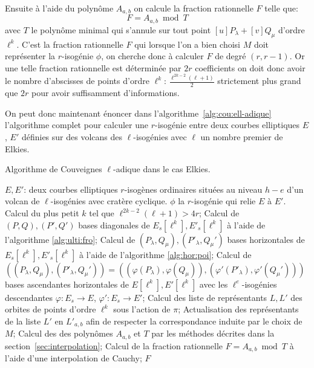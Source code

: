 \documentclass[10pt,a4paper]{book}
\theoremstyle{plain}
\theoremstyle{definition}
\theoremstyle{definition}
\theoremstyle{definition}
\theoremstyle{definition}
\theoremstyle{definition}
\theoremstyle{remark}
\theoremstyle{remark}
\theoremstyle{definition}
\begin{document}
Ensuite à l'aide du polynôme $A_{a,b}$ on calcule la fraction rationnelle $F$ telle que:
\[
F=A_{a,b} \bmod T
\]
avec $T$ le polynôme minimal qui s'annule sur tout point $[u]P_{\lambda}+[v]Q_{\mu}$ d'ordre 
$\ell^k$. C'est la fraction rationnelle $F$ qui lorsque l'on a bien choisi 
$M$ doit représenter la $r$-isogénie $\phi$, on cherche donc à 
calculer $F$ de degré $(r,r-1)$. Or une telle fraction rationnelle est 
déterminée par $2r$ coefficients on doit donc avoir
le nombre d'abscisses de points d'ordre $\ell^k$: $\frac{\ell^{2k-2}(\ell+1)}
{2}$ strictement plus grand que $2r$ pour avoir suffisamment d'informations.


On peut donc maintenant énoncer dans l'algorithme~\ref{alg:cou:ell-adique} 
l'algorithme complet  pour calculer une $r$-isogénie entre deux
courbes elliptiques $E$, $E'$ définies sur des volcans des $\ell$-isogénies avec
$\ell$ un nombre premier de Elkies. 

\begin{algorithm}
\caption{\label{alg:cou:ell-adique} Algorithme de Couveignes $\ell$-adique dans le cas Elkies.}
\begin{algorithmic}[1]
\REQUIRE $E,E'$: deux courbes elliptiques $r$-isogènes ordinaires situées au niveau $h-e$ d'un volcan de $\ell$-isogénies avec cratère cyclique.
\ENSURE $\phi$ la $r$-isogénie qui relie $E$ à $E'$.
\STATE Calcul du plus petit $k$ tel que $\ell^{2k-2}(\ell+1)>4r$;
\STATE  \label{alg:cou-ell:bdiag}
Calcul de $(P,Q),(P',Q')$ bases diagonales de $E_s[\ell^k],E'_s[\ell^k]$ à l'aide de l'algorithme \ref{alg:ulti:fro};
\STATE \label{alg:cou-ell:bhor}
Calcul de $(P_{\lambda},Q_{\mu}),(P'_{\lambda},Q_{\mu}')$ bases horizontales de
$E_s[\ell^k],E'_s[\ell^k]$ à l'aide de l'algorithme \ref{alg:hor:poi};
\STATE Calcul de $((P_{\lambda},Q_{\mu}),(P'_{\lambda},Q_{\mu}'))=
((\varphi(P_{\lambda}),\varphi(Q_{\mu})),(\varphi'(P'_{\lambda}),\varphi'(
Q_{\mu}')))$ bases ascendantes horizontales de $E[\ell^k],E'[\ell^k]$ avec les $\ell^e$-isogénies descendantes $\varphi: E_s \rightarrow E$, $\varphi': E_s \rightarrow E'$;
\ENDIF
\STATE \label{alg:cou-ell:rep} Calcul des liste de représentants $L,L'$ des orbites de points d'ordre $\ell^k$ sous l'action de $\pi$;
\STATE \label{alg:cou-ell:ord} Actualisation des représentants de la liste $L'$ en $L'_{a,b}$ afin de respecter la correspondance induite par le choix de $M$;
\STATE \label{alg:cou-ell:int} Calcul des des polynômes $A_{a,b}$ et $T$ par les méthodes décrites dans la section~\ref{sec:interpolation};
\STATE \label{alg:cou-ell:Cauchy} Calcul de la fraction rationnelle $F=A_{a,b} \bmod T$ à l'aide d'une interpolation de Cauchy;
\RETURN $F$
\ENDIF
\ENDFOR 
\end{algorithmic}
\end{algorithm}
\end{document}
